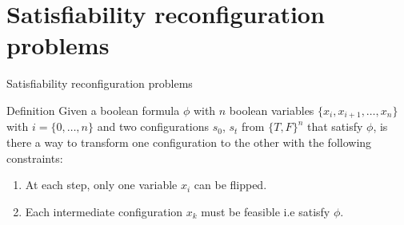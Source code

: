 \section{Satisfiability reconfiguration problems}

\begin{frame}{Satisfiability reconfiguration problems}
  \begin{block}{Definition}
  Given a boolean formula $\phi$ with $n$ boolean variables $\{x_i,x_{i+1}, \dots, x_n\}$ with $i = \{0,\dots, n\}$ and two configurations $s_0$, $s_t$ from $\{T,F\}^{n}$ that satisfy $\phi$, is there a way to transform one configuration to the other with the following constraints:
  \begin{enumerate}
      \item At each step, only one variable $x_i$ can be flipped.
      \item Each intermediate configuration $x_k$ must be feasible i.e satisfy $\phi$.
  \end{enumerate}
  \end{block}

\end{frame}
